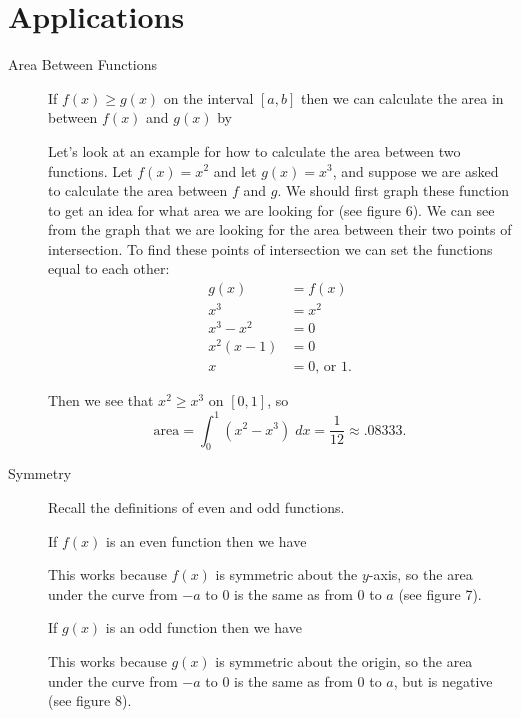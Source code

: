 \documentclass[11pt]{article}
\begin{document}
\section*{Applications}
\begin{description}
\item[Area Between Functions] If $f(x)\geq g(x)$ on the interval
  $[a,b]$ then we can calculate the area in between $f(x)$ and $g(x)$
  by
  \begin{center}
  \end{center}

  Let's look at an example for how to calculate the area between two
  functions. Let $f(x)=x^2$ and let $g(x)=x^3$, and suppose we are
  asked to calculate the area between $f$ and $g$.  We should first
  graph these function to get an idea for what area we are looking for
  (see figure 6). We can see from the graph that we are looking for
  the area between their two points of intersection.  To find these
  points of intersection we can set the functions equal to each other:
  \begin{align*}
    g(x) &= f(x)\\
    x^3 &= x^2\\
    x^3 - x^2 &= 0\\
    x^2(x-1) &= 0\\
    x &= 0\text{, or }1.
  \end{align*}

  Then we see that $x^2\geq x^3$ on $[0,1]$, so
  \[
  \text{area} = \int_0^1 (x^2 - x^3)\; dx = \frac{1}{12} \approx .08333.
  \]
  
\item[Symmetry] Recall the definitions of even and odd functions.

  If $f(x)$ is an even function then we have
  \begin{center}
  \end{center}
  This works because $f(x)$ is symmetric about the $y$-axis, so the
  area under the curve from $-a$ to 0 is the same as from 0 to $a$
  (see figure 7).

  If $g(x)$ is an odd function then we have
  \begin{center}
  \end{center}
  This works because $g(x)$ is symmetric about the origin, so the area
  under the curve from $-a$ to 0 is the same as from 0 to $a$, but is
  negative (see figure 8).


\end{description}
\end{document}
